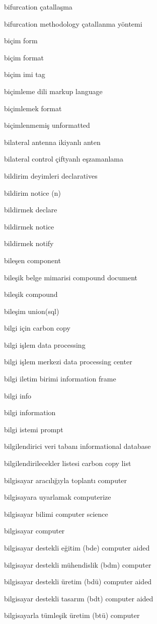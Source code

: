 \documentclass[12pt,fleqn]{article}\usepackage{../../common}
\begin{document}
bifurcation çatallaşma

bifurcation methodology çatallanma yöntemi

biçim form

biçim format

biçim imi tag

biçimleme dili markup language

biçimlemek format

biçimlenmemiş unformatted

bilateral antenna ikiyanlı anten

bilateral control çiftyanlı eşzamanlama

bildirim deyimleri declaratives

bildirim notice (n)

bildirmek declare

bildirmek notice

bildirmek notify

bileşen component

bileşik belge mimarisi compound document

bileşik compound

bileşim union(sql)

bilgi için carbon copy

bilgi işlem data processing

bilgi işlem merkezi data processing center

bilgi iletim birimi information frame

bilgi info

bilgi information

bilgi istemi prompt

bilgilendirici veri tabanı informational database

bilgilendirilecekler listesi carbon copy list

bilgisayar aracılığıyla toplantı computer

bilgisayara uyarlamak computerize

bilgisayar bilimi computer science

bilgisayar computer

bilgisayar destekli eğitim (bde) computer aided

bilgisayar destekli mühendislik (bdm) computer

bilgisayar destekli üretim (bdü) computer aided

bilgisayar destekli tasarım (bdt) computer aided

bilgisayarla tümleşik üretim (btü) computer
\end{document}
